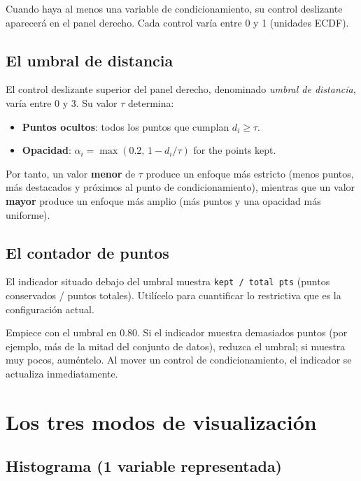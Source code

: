 \documentclass[11pt,a4paper]{article}
\begin{document}
Cuando haya al menos una variable de condicionamiento, su control deslizante aparecerá en el panel derecho. Cada control varía entre 0 y 1 (unidades ECDF).

\subsection{El umbral de distancia}

El control deslizante superior del panel derecho, denominado \emph{umbral de distancia}, varía entre 0 y 3. Su valor $\tau$ determina:

\begin{itemize}[leftmargin=1.4em]
  \item \textbf{Puntos ocultos}: todos los puntos que cumplan $d_i \ge \tau$.
  \item \textbf{Opacidad}: $\alpha_i = \max(0.2,\, 1 - d_i/\tau)$ for the points kept.
\end{itemize}

Por tanto, un valor \textbf{menor} de $\tau$ produce un enfoque más estricto (menos puntos, más destacados y próximos al punto de condicionamiento), mientras que un valor \textbf{mayor} produce un enfoque más amplio (más puntos y una opacidad más uniforme).

\subsection{El contador de puntos}

El indicador situado debajo del umbral muestra \texttt{kept / total pts} (puntos conservados / puntos totales). Utilícelo para cuantificar lo restrictiva que es la configuración actual.

\begin{tipbox}
Empiece con el umbral en 0.80. Si el indicador muestra demasiados puntos (por ejemplo, más de la mitad del conjunto de datos), reduzca el umbral; si muestra muy pocos, auméntelo. Al mover un control de condicionamiento, el indicador se actualiza inmediatamente.
\end{tipbox}

\section{Los tres modos de visualización}

\subsection{Histograma (1 variable representada)}
\end{document}
